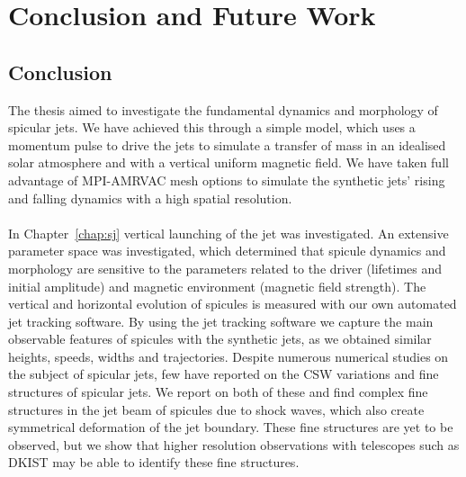 \documentclass[12pt]{ociamthesis}
\newcommand{\np}{\\ \\}
\begin{document}

\baselineskip=18pt


\chapter{Conclusion and Future Work}
\label{chap:con_and_fut_work}
\section{Conclusion}
\label{sec:con}
The thesis aimed to investigate the fundamental dynamics and morphology of spicular jets. We have achieved this through a simple model, which uses a momentum pulse to drive the jets to simulate a transfer of mass in an idealised solar atmosphere and with a vertical uniform magnetic field. We have taken full advantage of MPI-AMRVAC mesh options to simulate the synthetic jets' rising and falling dynamics with a high spatial resolution. \np
%
In Chapter~\ref{chap:sj} vertical launching of the jet was investigated. An extensive parameter space was investigated, which determined that spicule dynamics and morphology are sensitive to the parameters related to the driver (lifetimes and initial amplitude) and magnetic environment (magnetic field strength). The vertical and horizontal evolution of spicules is measured with our own automated jet tracking software. By using the jet tracking software we capture the main observable features of spicules with the synthetic jets, as we obtained similar heights, speeds, widths and trajectories. Despite numerous numerical studies on the subject of spicular jets, few have reported on the CSW variations and fine structures of spicular jets. We report on both of these and find complex fine structures in the jet beam of spicules due to shock waves, which also create symmetrical deformation of the jet boundary. These fine structures are yet to be observed, but we show that higher resolution observations with telescopes such as DKIST may be able to identify these fine structures.  \np
%
\end{document}
